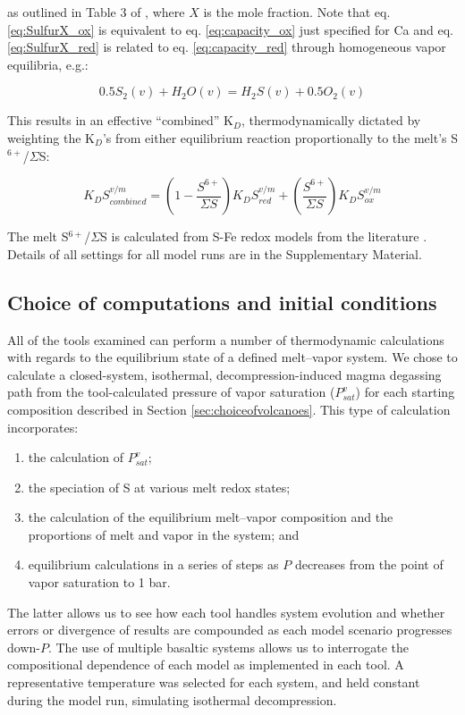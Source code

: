 \documentclass[draft, english]{volcanica-template}
\begin{document}
\noindent as outlined in Table 3 of \textcite{Ding2023}, where $X$ is the mole fraction. Note that eq. \ref{eq:SulfurX_ox} is equivalent to eq. \ref{eq:capacity_ox} just specified for Ca and eq. \ref{eq:SulfurX_red} is related to eq. \ref{eq:capacity_red} through homogeneous vapor equilibria, e.g.:

\begin{equation}
    0.5S_2(v) + H_2O(v) = H_2S(v) + 0.5O_2(v)
\end{equation}

\noindent This results in an effective ``combined'' K$_D$, thermodynamically dictated by weighting the K$_D$'s from either equilibrium reaction proportionally to the melt's S$^{6+}$/$\Sigma$S:

\begin{equation}
    K_DS^{v/m}_{combined} = \left( 1-\frac{S^{6+}}{\Sigma{S}} \right) K_DS^{v/m}_{red} + \left(\frac{S^{6+}}{\Sigma{S}} \right) K_DS^{v/m}_{ox}
\end{equation}

\noindent The melt S$^{6+}$/$\Sigma$S is calculated from S-Fe redox models from the literature \parencite[e.g.,][]{Nash2019, Oneill2022, Muth2021}. Details of all settings for all model runs are in the Supplementary Material.

\subsection{Choice of computations and initial conditions}
\label{sec:choiceofcomputations}

All of the tools examined can perform a number of thermodynamic calculations with regards to the equilibrium state of a defined melt–vapor system. We chose to calculate a closed-system, isothermal, decompression-induced magma degassing path from the tool-calculated pressure of vapor saturation ($P^v_{sat}$) for each starting composition described in Section \ref{sec:choiceofvolcanoes}. This type of calculation incorporates:
\begin{enumerate}
\item the calculation of $P^v_{sat}$; 
\item the speciation of S at various melt redox states; 
\item the calculation of the equilibrium melt–vapor composition and the proportions of melt and vapor in the system; and 
\item equilibrium calculations in a series of steps as $P$ decreases from the point of vapor saturation to 1 bar. 
\end{enumerate}
The latter allows us to see how each tool handles system evolution and whether errors or divergence of results are compounded as each model scenario progresses down-$P$. The use of multiple basaltic systems allows us to interrogate the compositional dependence of each model as implemented in each tool. A representative temperature was selected for each system, and held constant during the model run, simulating isothermal decompression. 
\end{document}
